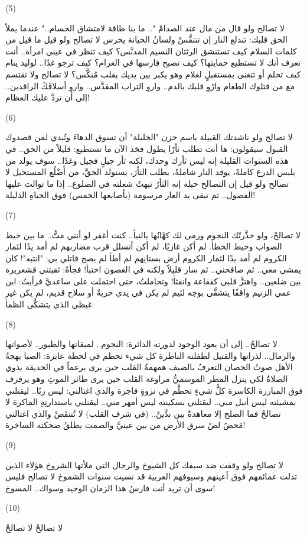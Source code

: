 \documentclass{article}
\begin{document}
\begin{modernpoem*}
(5)

لا تصالح
ولو قال من مال عند الصدامْ
".. ما بنا طاقة لامتشاق الحسام.."
عندما يملأ الحق قلبك:
تندلع النار إن تتنفَّسْ
ولسانُ الخيانة يخرس
لا تصالح
ولو قيل ما قيل من كلمات السلام
كيف تستنشق الرئتان النسيم المدنَّس؟
كيف تنظر في عيني امرأة..
أنت تعرف أنك لا تستطيع حمايتها؟
كيف تصبح فارسها في الغرام؟
كيف ترجو غدًا.. لوليد ينام
كيف تحلم أو تتغنى بمستقبلٍ لغلام
وهو يكبر بين يديك بقلب مُنكَّس؟
لا تصالح
ولا تقتسم مع من قتلوك الطعام
وارْوِ قلبك بالدم..
واروِ التراب المقدَّس..
واروِ أسلافَكَ الراقدين..
إلى أن تردَّ عليك العظام!

(6)

لا تصالح
ولو ناشدتك القبيلة
باسم حزن "الجليلة"
أن تسوق الدهاءَ
وتُبدي لمن قصدوك القبول
سيقولون:
ها أنت تطلب ثأرًا يطول
فخذ الآن ما تستطيع:
قليلاً من الحق..
في هذه السنوات القليلة
إنه ليس ثأرك وحدك،
لكنه ثأر جيلٍ فجيل
وغدًا..
سوف يولد من يلبس الدرع كاملةً،
يوقد النار شاملةً،
يطلب الثأرَ،
يستولد الحقَّ،
من أَضْلُع المستحيل
لا تصالح
ولو قيل إن التصالح حيلة
إنه الثأرُ
تبهتُ شعلته في الضلوع..
إذا ما توالت عليها الفصول..
ثم تبقى يد العار مرسومة (بأصابعها الخمس)
فوق الجباهِ الذليلة!

(7)

لا تصالحْ، ولو حذَّرتْك النجوم
ورمى لك كهَّانُها بالنبأ..
كنت أغفر لو أنني متُّ..
ما بين خيط الصواب وخيط الخطأ.
لم أكن غازيًا،
لم أكن أتسلل قرب مضاربهم
لم أمد يدًا لثمار الكروم
لم أمد يدًا لثمار الكروم
أرض بستانِهم لم أطأ
لم يصح قاتلي بي: "انتبه"!
كان يمشي معي..
ثم صافحني..
ثم سار قليلاً
ولكنه في الغصون اختبأ!
فجأةً:
ثقبتني قشعريرة بين ضلعين..
واهتزَّ قلبي كفقاعة وانفثأ!
وتحاملتُ، حتى احتملت على ساعديَّ
فرأيتُ: ابن عمي الزنيم
واقفًا يتشفَّى بوجه لئيم
لم يكن في يدي حربةٌ
أو سلاح قديم،
لم يكن غير غيظي الذي يتشكَّى الظمأ

(8)

لا تصالحُ..
إلى أن يعود الوجود لدورته الدائرة:
النجوم.. لميقاتها
والطيور.. لأصواتها
والرمال.. لذراتها
والقتيل لطفلته الناظرة
كل شيء تحطم في لحظة عابرة:
الصبا بهجةُ الأهل صوتُ الحصان التعرفُ بالضيف همهمةُ القلب
حين يرى برعماً في الحديقة يذوي الصلاةُ لكي ينزل المطر الموسميُّ مراوغة القلب حين يرى طائر الموتِ
وهو يرفرف فوق المبارزة الكاسرة
كلُّ شيءٍ تحطَّم في نزوةٍ فاجرة
والذي اغتالني: ليس ربًا..
ليقتلني بمشيئته
ليس أنبل مني.. ليقتلني بسكينته
ليس أمهر مني.. ليقتلني باستدارتِهِ الماكرة
لا تصالحْ
فما الصلح إلا معاهدةٌ بين ندَّينْ..
(في شرف القلب)
لا تُنتقَصْ
والذي اغتالني مَحضُ لصْ
سرق الأرض من بين عينيَّ
والصمت يطلقُ ضحكته الساخرة!

(9)

لا تصالح
ولو وقفت ضد سيفك كل الشيوخ
والرجال التي ملأتها الشروخ
هؤلاء الذين تدلت عمائمهم فوق أعينهم
وسيوفهم العربية قد نسيت سنوات الشموخ
لا تصالح
فليس سوى أن تريد
أنت فارسُ هذا الزمان الوحيد
وسواك.. المسوخ!

(10)

لا تصالحْ
لا تصالحْ
\end{modernpoem*}
\end{document}
